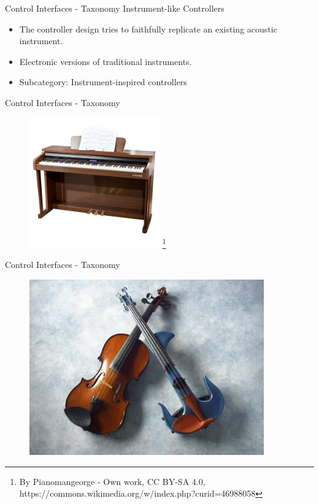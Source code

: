 \documentclass{beamer}
\newcommand\blfootnote[1]{%
  \begingroup
  \renewcommand\thefootnote{}\footnote{#1}%
  \addtocounter{footnote}{-1}%
  \endgroup
}
\begin{document}
\begin{frame}{Control Interfaces - Taxonomy}
   Instrument-like Controllers\\
   \vspace{5mm}
   \begin{itemize}
        \item The controller design tries to faithfully replicate an existing acoustic instrument.
        \item Electronic versions of traditional instruments.
        \item Subcategory: Instrument-inspired controllers
\end{itemize}
\end{frame}

\begin{frame}{Control Interfaces - Taxonomy}
    \begin{figure}[h]
        \includegraphics[width=0.5\textwidth]{epiano.jpg}\blfootnote{By Pianomangeorge - Own work, CC BY-SA 4.0, https://commons.wikimedia.org/w/index.php?curid=46988058}
    \end{figure}
\end{frame}

\begin{frame}{Control Interfaces - Taxonomy}
    \begin{figure}[h]
        \includegraphics[width=0.9\textwidth]{eviolin.jpeg}
    \end{figure}
\end{frame}
\end{document}
